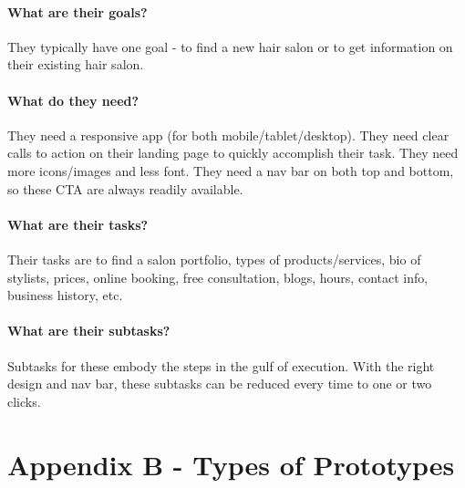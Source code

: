 \paragraph{What are their goals?}
They typically have one goal - to find a new hair salon or to get information on their existing hair salon.

\paragraph{What do they need?}
They need a responsive app (for both mobile/tablet/desktop). They need clear calls to action on their landing page to quickly accomplish their task. They need more icons/images and less font. They need a nav bar on both top and bottom, so these CTA are always readily available.

\paragraph{What are their tasks?}
Their tasks are to find a salon portfolio, types of products/services, bio of stylists, prices, online booking, free consultation, blogs, hours, contact info, business history, etc.

\paragraph{What are their subtasks?}
Subtasks for these embody the steps in the gulf of execution. With the right design and nav bar, these subtasks can be reduced every time to one or two clicks.


\section{Appendix B - Types of Prototypes}

